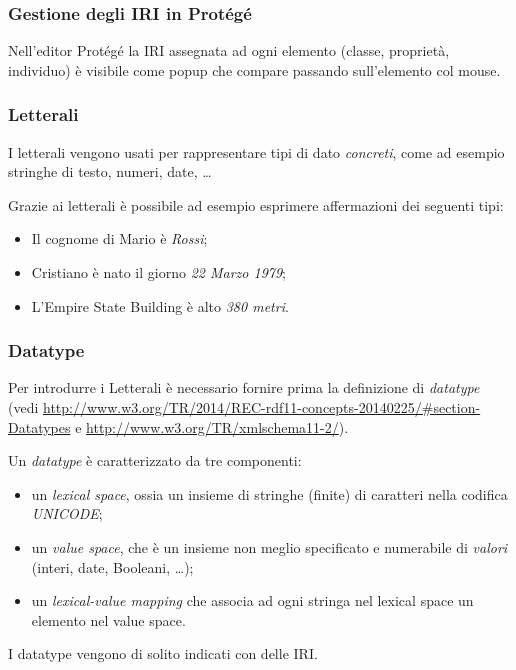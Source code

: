 \documentclass[8pt]{beamer}
\begin{document}
\begin{frame}
  \frametitle{Gestione degli IRI in Prot\'eg\'e}
  
  Nell'editor Prot\'eg\'e la IRI assegnata ad ogni elemento (classe, propriet\`a,
  individuo) \`e visibile come popup che compare passando sull'elemento col mouse.
  \vspace{\baselineskip}
  

\end{frame}

\begin{frame}
  \frametitle{Letterali}
  I letterali vengono usati per rappresentare tipi di dato \emph{concreti},
  come ad esempio stringhe di testo, numeri, date, \ldots
  \vspace{\baselineskip}

  Grazie ai letterali \`e possibile ad esempio esprimere affermazioni dei seguenti tipi:
  \begin{itemize}
  \item Il cognome di Mario \`e \emph{Rossi};
  \item Cristiano \`e nato il giorno \emph{22 Marzo 1979};
  \item L'Empire State Building \`e alto \emph{380 metri}.
  \end{itemize}
\end{frame}

\begin{frame}
  \frametitle{Datatype}
  Per introdurre i Letterali \`e necessario fornire prima la definizione di \emph{datatype}
  (vedi \url{http://www.w3.org/TR/2014/REC-rdf11-concepts-20140225/\#section-Datatypes} e 
  \url{http://www.w3.org/TR/xmlschema11-2/}).
  \vspace{\baselineskip}

  Un \emph{datatype} \`e caratterizzato da tre componenti:
  \begin{itemize}
    \item un \emph{lexical space}, ossia un insieme di stringhe (finite) di caratteri nella codifica \emph{UNICODE};
    \item un \emph{value space}, che \`e un insieme non meglio specificato e numerabile di \emph{valori} (interi, date,
    Booleani, \ldots);
    \item un \emph{lexical-value mapping} che associa ad ogni stringa nel lexical space un elemento nel value space.
  \end{itemize}
  \vspace{\baselineskip}

  I datatype vengono di solito indicati con delle IRI.
\end{frame}
\end{document}
